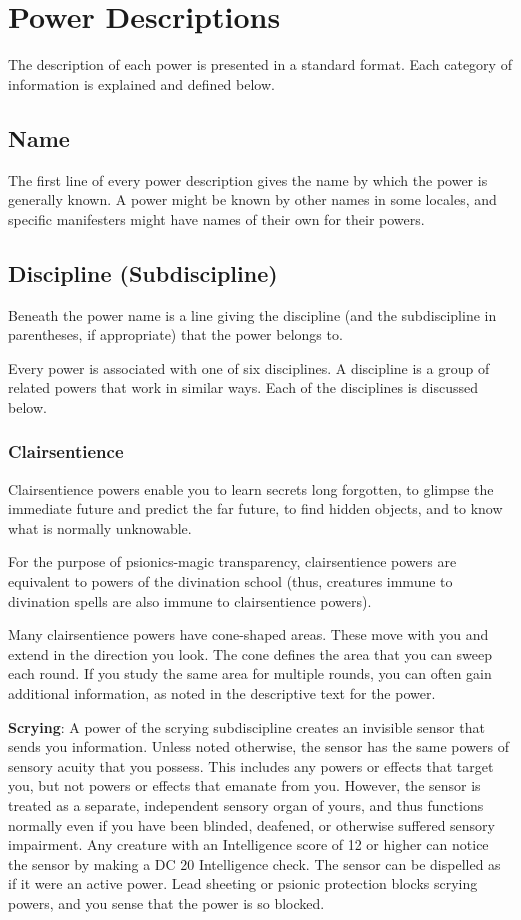 \section{Power Descriptions}
The description of each power is presented in a standard format. Each category of information is explained and defined below.

\subsection{Name}
The first line of every power description gives the name by which the power is generally known. A power might be known by other names in some locales, and specific manifesters might have names of their own for their powers.

\subsection{Discipline (Subdiscipline)}
Beneath the power name is a line giving the discipline (and the subdiscipline in parentheses, if appropriate) that the power belongs to.

Every power is associated with one of six disciplines. A discipline is a group of related powers that work in similar ways. Each of the disciplines is discussed below.

\subsubsection{Clairsentience}
Clairsentience powers enable you to learn secrets long forgotten, to glimpse the immediate future and predict the far future, to find hidden objects, and to know what is normally unknowable.

For the purpose of psionics-magic transparency, clairsentience powers are equivalent to powers of the divination school (thus, creatures immune to divination spells are also immune to clairsentience powers).

Many clairsentience powers have cone-shaped areas. These move with you and extend in the direction you look. The cone defines the area that you can sweep each round. If you study the same area for multiple rounds, you can often gain additional information, as noted in the descriptive text for the power.

\textbf{Scrying}: A power of the scrying subdiscipline creates an invisible sensor that sends you information. Unless noted otherwise, the sensor has the same powers of sensory acuity that you possess. This includes any powers or effects that target you, but not powers or effects that emanate from you. However, the sensor is treated as a separate, independent sensory organ of yours, and thus functions normally even if you have been blinded, deafened, or otherwise suffered sensory impairment. Any creature with an Intelligence score of 12 or higher can notice the sensor by making a DC 20 Intelligence check. The sensor can be dispelled as if it were an active power. Lead sheeting or psionic protection blocks scrying powers, and you sense that the power is so blocked.

